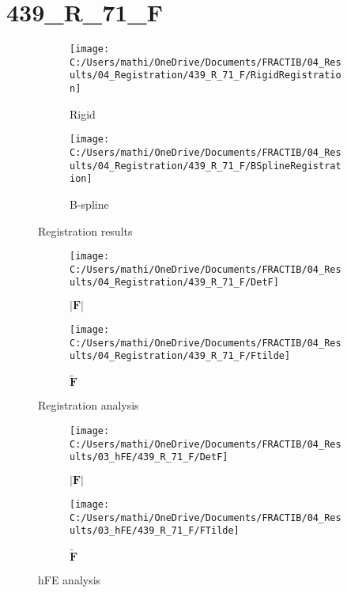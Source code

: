 \documentclass{article}%
\begin{document}
%
\newpage%
\section*{439\_R\_71\_F}%
\label{sec:439R71F}%


\begin{figure}[h!]%
\begin{subfigure}[b]{0.5\linewidth}%
\texttt{[image: C:/Users/mathi/OneDrive/Documents/FRACTIB/04\_Results/04\_Registration/439\_R\_71\_F/RigidRegistration]}%
\caption{Rigid}%
\end{subfigure}%
\begin{subfigure}[b]{0.5\linewidth}%
\texttt{[image: C:/Users/mathi/OneDrive/Documents/FRACTIB/04\_Results/04\_Registration/439\_R\_71\_F/BSplineRegistration]}%
\caption{B{-}spline}%
\end{subfigure}%
\caption{Registration results}%
\end{figure}

%


\begin{figure}[h!]%
\begin{subfigure}[b]{0.5\linewidth}%
\texttt{[image: C:/Users/mathi/OneDrive/Documents/FRACTIB/04\_Results/04\_Registration/439\_R\_71\_F/DetF]}%
\caption{$|\mathbf{F}|$}%
\end{subfigure}%
\begin{subfigure}[b]{0.5\linewidth}%
\texttt{[image: C:/Users/mathi/OneDrive/Documents/FRACTIB/04\_Results/04\_Registration/439\_R\_71\_F/Ftilde]}%
\caption{$\tilde{\mathbf{F}}$}%
\end{subfigure}%
\caption{Registration analysis}%
\end{figure}

%


\begin{figure}[h!]%
\begin{subfigure}[b]{0.5\linewidth}%
\texttt{[image: C:/Users/mathi/OneDrive/Documents/FRACTIB/04\_Results/03\_hFE/439\_R\_71\_F/DetF]}%
\caption{$|\mathbf{F}|$}%
\end{subfigure}%
\begin{subfigure}[b]{0.5\linewidth}%
\texttt{[image: C:/Users/mathi/OneDrive/Documents/FRACTIB/04\_Results/03\_hFE/439\_R\_71\_F/FTilde]}%
\caption{$\tilde{\mathbf{F}}$}%
\end{subfigure}%
\caption{hFE analysis}%
\end{figure}
\end{document}
